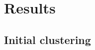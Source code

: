 \documentclass[11pt]{article}
\begin{document}
        \section{Results}

            \subsection{Initial clustering}






                

\end{document}
